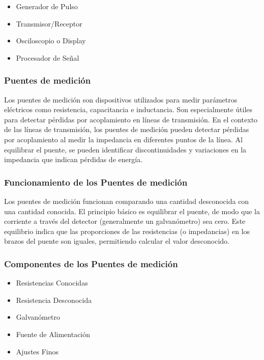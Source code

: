             \begin{itemize}
                \item Generador de Pulso
                \item Transmisor/Receptor
                \item Osciloscopio o Display
                \item Procesador de Señal
            \end{itemize}

        \subsubsection{Puentes de medición}

            Los puentes de medición son dispositivos utilizados para medir parámetros eléctricos como resistencia, capacitancia e inductancia. Son especialmente útiles para detectar pérdidas por acoplamiento en líneas de transmisión. En el contexto de las líneas de transmisión, los puentes de medición pueden detectar pérdidas por acoplamiento al medir la impedancia en diferentes puntos de la línea. Al equilibrar el puente, se pueden identificar discontinuidades y variaciones en la impedancia que indican pérdidas de energía.

        \subsubsection*{Funcionamiento de los Puentes de medición}

            Los puentes de medición funcionan comparando una cantidad desconocida con una cantidad conocida. El principio básico es equilibrar el puente, de modo que la corriente a través del detector (generalmente un galvanómetro) sea cero. Este equilibrio indica que las proporciones de las resistencias (o impedancias) en los brazos del puente son iguales, permitiendo calcular el valor desconocido.

        \subsubsection*{Componentes de los Puentes de medición}
            
            \begin{itemize}
                \item Resistencias Conocidas
                \item Resistencia Desconocida
                \item Galvanómetro
                \item Fuente de Alimentación
                \item Ajustes Finos
            \end{itemize}

